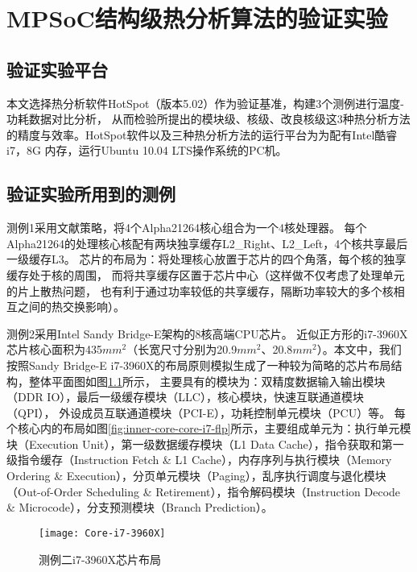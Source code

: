 

\chapter{MPSoC结构级热分析算法的验证实验}
\label{cha:SSTAexperiments}

\section{验证实验平台}
本文选择热分析软件HotSpot（版本5.02）作为验证基准，构建3个测例进行温度-功耗数据对比分析， 从而检验所提出的模块级、核级、改良核级这3种热分析方法的精度与效率。HotSpot软件以及三种热分析方法的运行平台为为配有Intel酷睿i7，8G 内存，运行Ubuntu 10.04 LTS操作系统的PC机。

\section{验证实验所用到的测例}
测例1采用文献策略，将4个Alpha21264核心组合为一个4核处理器。 每个Alpha21264的处理核心核配有两块独享缓存L2\_Right、L2\_Left，4个核共享最后一级缓存L3。 芯片的布局为：将处理核心放置于芯片的四个角落，每个核的独享缓存处于核的周围， 而将共享缓存区置于芯片中心（这样做不仅考虑了处理单元的片上散热问题， 也有利于通过功率较低的共享缓存，隔断功率较大的多个核相互之间的热交换影响）。

测例2采用Intel Sandy Bridge-E架构的8核高端CPU芯片。 近似正方形的i7-3960X芯片核心面积为435$mm^2$（长宽尺寸分别为20.9$mm^2$、20.8$mm^2$）。本文中，我们按照Sandy Bridge-E i7-3960X的布局原则模拟生成了一种较为简略的芯片布局结构，整体平面图如图\ref{fig:core-i7-flp}所示， 主要具有的模块为：双精度数据输入输出模块（DDR IO），最后一级缓存模块（LLC），核心模块，快速互联通道模块（QPI）， 外设成员互联通道模块（PCI-E），功耗控制单元模块（PCU）等。 每个核心内的布局如图\ref{fig:inner-core-core-i7-flp}所示，主要组成单元为：执行单元模块（Execution Unit），第一级数据缓存模块（L1 Data Cache），指令获取和第一级指令缓存（Instruction Fetch \& L1 Cache），内存序列与执行模块（Memory Ordering \& Execution），分页单元模块（Paging），乱序执行调度与退化模块（Out-of-Order Scheduling \& Retirement），指令解码模块（Instruction Decode \& Microcode），分支预测模块（Branch Prediction）。

\begin{figure}[H]
  \centering
  \texttt{[image: Core-i7-3960X]}
  \caption{测例二i7-3960X芯片布局}
  \label{fig:core-i7-flp}
\end{figure}

